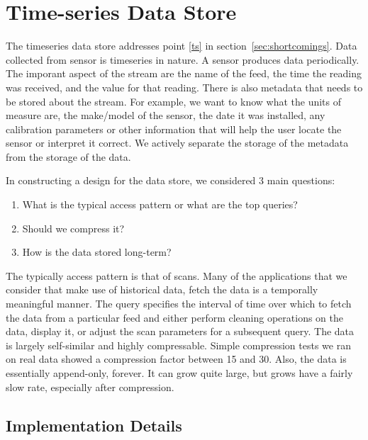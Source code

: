 \section{Time-series Data Store}

The timeseries data store addresses point \ref{ts} in section~\ref{sec:shortcomings}.
Data collected from sensor is timeseries in nature.  A sensor produces data periodically.  The imporant aspect of
the stream are the name of the feed, the time the reading was received, and the value for that reading.  There is also
metadata that needs to be stored about the stream.  For example, we want to know what the units of measure are, 
the make/model of the sensor, the date it was installed, any calibration parameters or other information that will help 
the user locate the sensor or interpret it correct.  We actively separate the storage of the metadata from the storage 
of the data.

In constructing a design for the data store, we considered 3 main questions:

\begin{enumerate}
\item What is the typical access pattern or what are the top queries?
\item Should we compress it?
\item How is the data stored long-term?
\end{enumerate}

The typically access pattern is that of scans.  Many of the applications that we consider that make use of historical data, fetch the data
is a temporally meaningful manner.  The query specifies the interval of time over which to fetch the data from a particular feed
and either perform cleaning operations on the data, display it, or adjust the scan parameters for a subsequent query.
The data is largely self-similar and highly compressable.  Simple compression tests we ran on real data showed a compression factor 
between 15 and 30.  Also, the data is essentially append-only, forever.  It can grow quite large, but grows have a fairly 
slow rate, especially after compression.  

\subsection{Implementation Details}

